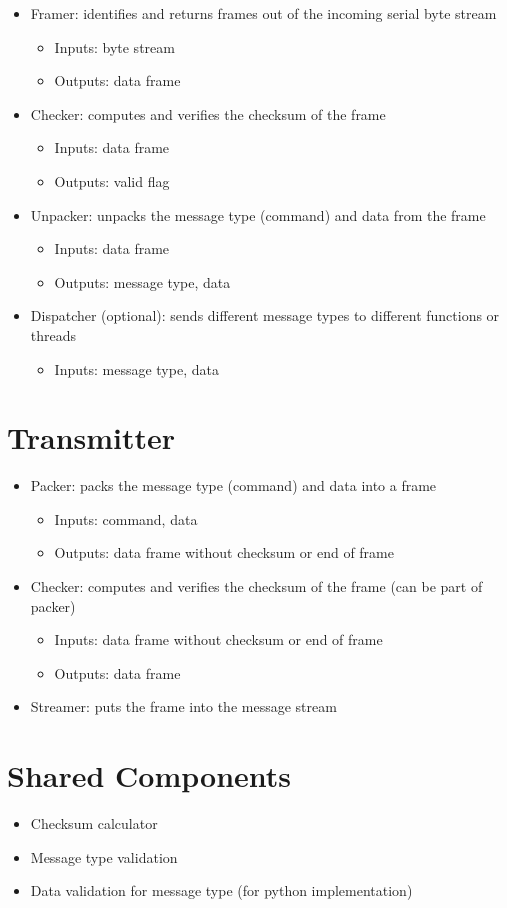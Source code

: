 \documentclass{customdocclass}
\begin{document}
\begin{itemize}
  \item Framer: identifies and returns frames out of the incoming serial byte stream
  \begin{itemize}
    \item Inputs: byte stream
    \item Outputs: data frame
  \end{itemize}
  \item Checker: computes and verifies the checksum of the frame
  \begin{itemize}
    \item Inputs: data frame
    \item Outputs: valid flag
  \end{itemize}
  \item Unpacker: unpacks the message type (command) and data from the frame
  \begin{itemize}
    \item Inputs: data frame
    \item Outputs: message type, data
  \end{itemize}
  \item Dispatcher (optional): sends different message types to different functions or threads
  \begin{itemize}
    \item Inputs: message type, data
  \end{itemize}
\end{itemize}

\section{Transmitter}

\begin{itemize}
  \item Packer: packs the message type (command) and data into a frame
  \begin{itemize}
    \item Inputs: command, data
    \item Outputs: data frame without checksum or end of frame
  \end{itemize}
  \item Checker: computes and verifies the checksum of the frame (can be part of packer)
  \begin{itemize}
    \item Inputs: data frame without checksum or end of frame
    \item Outputs: data frame
  \end{itemize}
  \item Streamer: puts the frame into the message stream
\end{itemize}

\section{Shared Components}

\begin{itemize}
  \item Checksum calculator
  \item Message type validation
  \item Data validation for message type (for python implementation)
\end{itemize}
\end{document}
